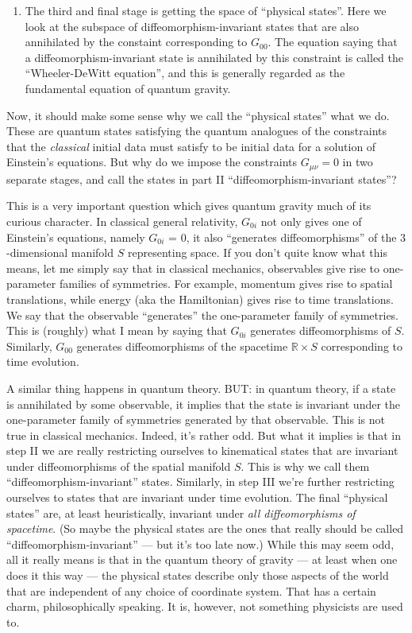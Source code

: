 \documentclass[12pt]{article}
\def\tightlist{}
\begin{document}
\begin{enumerate}
\def\labelenumi{\Roman{enumi})}
\setcounter{enumi}{2}
\tightlist
\item
  The third and final stage is getting the space of ``physical states''.
  Here we look at the subspace of diffeomorphism-invariant states that
  are also annihilated by the constaint corresponding to \(G_{00}\). The
  equation saying that a diffeomorphism-invariant state is annihilated
  by this constraint is called the ``Wheeler-DeWitt equation'', and this
  is generally regarded as the fundamental equation of quantum gravity.
\end{enumerate}

Now, it should make some sense why we call the ``physical states'' what
we do. These are quantum states satisfying the quantum analogues of the
constraints that the \emph{classical} initial data must satisfy to be
initial data for a solution of Einstein's equations. But why do we
impose the constraints \(G_{\mu \nu} = 0\) in two separate stages, and
call the states in part II ``diffeomorphism-invariant states''?

This is a very important question which gives quantum gravity much of
its curious character. In classical general relativity, \(G_{0i}\) not
only gives one of Einstein's equations, namely \(G_{0i}\) = 0, it also
``generates diffeomorphisms'' of the \(3\)-dimensional manifold \(S\)
representing space. If you don't quite know what this means, let me
simply say that in classical mechanics, observables give rise to
one-parameter families of symmetries. For example, momentum gives rise
to spatial translations, while energy (aka the Hamiltonian) gives rise
to time translations. We say that the observable ``generates'' the
one-parameter family of symmetries. This is (roughly) what I mean by
saying that \(G_{0i}\) generates diffeomorphisms of \(S\). Similarly,
\(G_{00}\) generates diffeomorphisms of the spacetime
\(\mathbb{R} \times S\) corresponding to time evolution.

A similar thing happens in quantum theory. BUT: in quantum theory, if a
state is annihilated by some observable, it implies that the state is
invariant under the one-parameter family of symmetries generated by that
observable. This is not true in classical mechanics. Indeed, it's rather
odd. But what it implies is that in step II we are really restricting
ourselves to kinematical states that are invariant under diffeomorphisms
of the spatial manifold \(S\). This is why we call them
``diffeomorphism-invariant'' states. Similarly, in step III we're
further restricting ourselves to states that are invariant under time
evolution. The final ``physical states'' are, at least heuristically,
invariant under \emph{all diffeomorphisms of spacetime}. (So maybe the
physical states are the ones that really should be called
``diffeomorphism-invariant'' --- but it's too late now.) While this may
seem odd, all it really means is that in the quantum theory of gravity
--- at least when one does it this way --- the physical states describe
only those aspects of the world that are independent of any choice of
coordinate system. That has a certain charm, philosophically speaking.
It is, however, not something physicists are used to.
\end{document}
